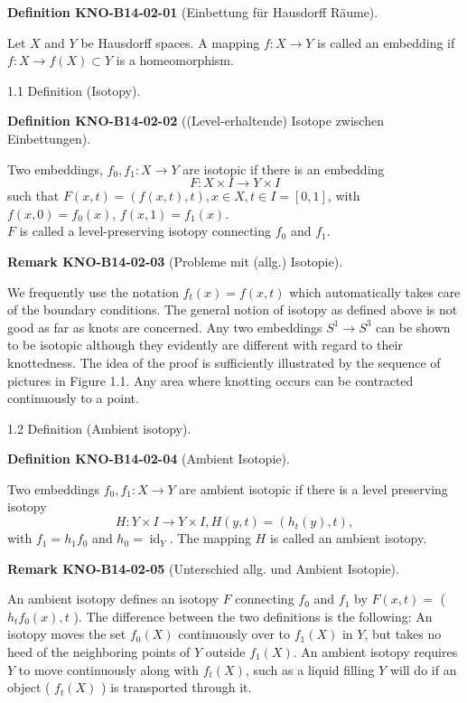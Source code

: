 \documentclass[10pt, letterpaper]{article}
\newcommand{\CustomHeading}[3]{%
  \par\medskip\noindent%
  \textbf{#1 #2} \textnormal{(#3)}.\enskip%
}
\newenvironment{DEF}[2]{\begin{unitbox}\CustomHeading{Definition}{#1}{#2}}{\end{unitbox}}
\newenvironment{REM}[2]{\begin{unitbox}\CustomHeading{Remark}{#1}{#2}}{\end{unitbox}}
\begin{document}
\begin{DEF}{KNO-B14-02-01}{Einbettung für Hausdorff Räume}
Let $X$ and $Y$ be Hausdorff spaces. A mapping $f: X \rightarrow Y$ is called an embedding if $f: X \rightarrow f(X) \subset Y$ is a homeomorphism.
\end{DEF}

1.1 Definition (Isotopy). 

\begin{DEF}{KNO-B14-02-02}{(Level-erhaltende) Isotope zwischen Einbettungen}
Two embeddings, $f_{0}, f_{1}: X \rightarrow Y$ are isotopic if there is an embedding
$$
F: X \times I \rightarrow Y \times I
$$
such that $F(x, t)=(f(x, t), t), x \in X, t \in I=[0,1]$, with $f(x, 0)=f_{0}(x)$, $f(x, 1)=f_{1}(x)$.\\
$F$ is called a level-preserving isotopy connecting $f_{0}$ and $f_{1}$.
\end{DEF}

\begin{REM}{KNO-B14-02-03}{Probleme mit (allg.) Isotopie}
We frequently use the notation $f_{t}(x)=f(x, t)$ which automatically takes care of the boundary conditions. The general notion of isotopy as defined above is not good as far as knots are concerned. Any two embeddings $S^{1} \rightarrow S^{3}$ can be shown to be isotopic although they evidently are different with regard to their knottedness. The idea of the proof is sufficiently illustrated by the sequence of pictures in Figure 1.1. Any area where knotting occurs can be contracted continuously to a point.
\end{REM}

1.2 Definition (Ambient isotopy). 

\begin{DEF}{KNO-B14-02-04}{Ambient Isotopie}
Two embeddings $f_{0}, f_{1}: X \rightarrow Y$ are ambient isotopic if there is a level preserving isotopy
$$
H: Y \times I \rightarrow Y \times I, H(y, t)=\left(h_{t}(y), t\right),
$$
with $f_{1}=h_{1} f_{0}$ and $h_{0}=\operatorname{id}_{Y}$. The mapping $H$ is called an ambient isotopy.
\end{DEF}

\begin{REM}{KNO-B14-02-05}{Unterschied allg. und Ambient Isotopie}
An ambient isotopy defines an isotopy $F$ connecting $f_{0}$ and $f_{1}$ by $F(x, t)=$ ( $h_{t} f_{0}(x), t$ ). The difference between the two definitions is the following: An isotopy moves the set $f_{0}(X)$ continuously over to $f_{1}(X)$ in $Y$, but takes no heed of the neighboring points of $Y$ outside $f_{1}(X)$. An ambient isotopy requires $Y$ to move continuously along with $f_{t}(X)$, such as a liquid filling $Y$ will do if an object ( $f_{t}(X)$ ) is transported through it.
\end{REM}
\end{document}
